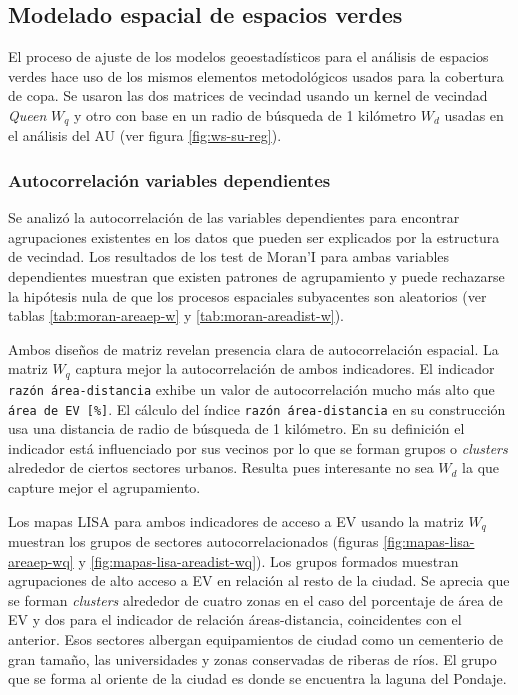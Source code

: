 \documentclass[12pt,a4paper,oneside, openany]{book}
\theoremstyle{definition}
\theoremstyle{definition}
\theoremstyle{definition}
\theoremstyle{remark}
\begin{document}
\subsection{Modelado espacial de espacios
verdes}\label{modelado-espacial-de-espacios-verdes}

El proceso de ajuste de los modelos geoestadísticos para el análisis de
espacios verdes hace uso de los mismos elementos metodológicos usados
para la cobertura de copa. Se usaron las dos matrices de vecindad usando
un kernel de vecindad \emph{Queen} \(W_q\) y otro con base en un radio
de búsqueda de 1 kilómetro \(W_d\) usadas en el análisis del AU (ver
figura \ref{fig:ws-su-reg}).

\subsubsection{Autocorrelación variables
dependientes}\label{autocorrelaciuxf3n-variables-dependientes-1}

Se analizó la autocorrelación de las variables dependientes para
encontrar agrupaciones existentes en los datos que pueden ser explicados
por la estructura de vecindad. Los resultados de los test de Moran'I
para ambas variables dependientes muestran que existen patrones de
agrupamiento y puede rechazarse la hipótesis nula de que los procesos
espaciales subyacentes son aleatorios (ver tablas
\ref{tab:moran-areaep-w} y \ref{tab:moran-areadist-w}).

Ambos diseños de matriz revelan presencia clara de autocorrelación
espacial. La matriz \(W_q\) captura mejor la autocorrelación de ambos
indicadores. El indicador \texttt{razón\ área-distancia} exhibe un valor
de autocorrelación mucho más alto que \texttt{área\ de\ EV\ {[}\%{]}}.
El cálculo del índice \texttt{razón\ área-distancia} en su construcción
usa una distancia de radio de búsqueda de 1 kilómetro. En su definición
el indicador está influenciado por sus vecinos por lo que se forman
grupos o \emph{clusters} alrededor de ciertos sectores urbanos. Resulta
pues interesante no sea \(W_d\) la que capture mejor el agrupamiento.

Los mapas LISA para ambos indicadores de acceso a EV usando la matriz
\(W_q\) muestran los grupos de sectores autocorrelacionados (figuras
\ref{fig:mapas-lisa-areaep-wq} y \ref{fig:mapas-lisa-areadist-wq}). Los
grupos formados muestran agrupaciones de alto acceso a EV en relación al
resto de la ciudad. Se aprecia que se forman \emph{clusters} alrededor
de cuatro zonas en el caso del porcentaje de área de EV y dos para el
indicador de relación áreas-distancia, coincidentes con el anterior.
Esos sectores albergan equipamientos de ciudad como un cementerio de
gran tamaño, las universidades y zonas conservadas de riberas de ríos.
El grupo que se forma al oriente de la ciudad es donde se encuentra la
laguna del Pondaje.
\end{document}
